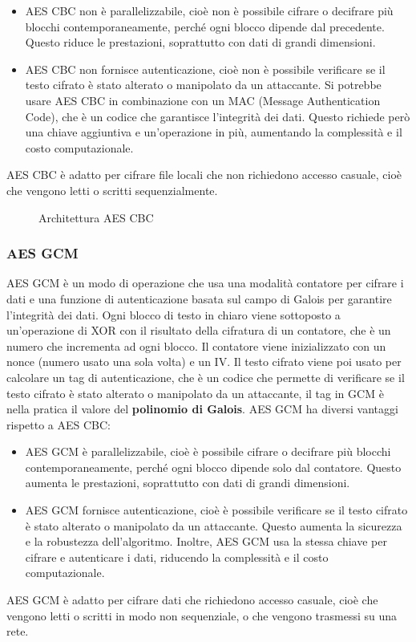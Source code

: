 \begin{itemize} 
\item AES CBC non è parallelizzabile, cioè non è possibile cifrare o decifrare più blocchi contemporaneamente, perché ogni blocco dipende dal precedente. Questo riduce le prestazioni, soprattutto con dati di grandi dimensioni. 
\item AES CBC non fornisce autenticazione, cioè non è possibile verificare se il testo cifrato è stato alterato o manipolato da un attaccante. Si potrebbe usare AES CBC in combinazione con un MAC (Message Authentication Code), che è un codice che garantisce l’integrità dei dati. Questo richiede però una chiave aggiuntiva e un’operazione in più, aumentando la complessità e il costo computazionale. \end{itemize}
AES CBC è adatto per cifrare file locali che non richiedono accesso casuale, cioè che vengono letti o scritti sequenzialmente.

\begin{figure}[h]
    \centering
    
    \caption{Architettura AES CBC}
    \label{fig:AES-CBC-diagramma}
\end{figure}

\subsubsection{AES GCM}
AES GCM è un modo di operazione che usa una modalità contatore per cifrare i dati e una funzione di autenticazione basata sul campo di Galois per garantire l’integrità dei dati. Ogni blocco di testo in chiaro viene sottoposto a un’operazione di XOR con il risultato della cifratura di un contatore, che è un numero che incrementa ad ogni blocco. Il contatore viene inizializzato con un nonce (numero usato una sola volta) e un IV. Il testo cifrato viene poi usato per calcolare un tag di autenticazione, che è un codice che permette di verificare se il testo cifrato è stato alterato o manipolato da un attaccante, il tag in GCM è nella pratica il valore del \textbf{polinomio di Galois}. AES GCM ha diversi vantaggi rispetto a AES CBC:

\begin{itemize} 
\item AES GCM è parallelizzabile, cioè è possibile cifrare o decifrare più blocchi contemporaneamente, perché ogni blocco dipende solo dal contatore. Questo aumenta le prestazioni, soprattutto con dati di grandi dimensioni. 
\item AES GCM fornisce autenticazione, cioè è possibile verificare se il testo cifrato è stato alterato o manipolato da un attaccante. Questo aumenta la sicurezza e la robustezza dell’algoritmo. Inoltre, AES GCM usa la stessa chiave per cifrare e autenticare i dati, riducendo la complessità e il costo computazionale.
\end{itemize}
AES GCM è adatto per cifrare dati che richiedono accesso casuale, cioè che vengono letti o scritti in modo non sequenziale, o che vengono trasmessi su una rete.

